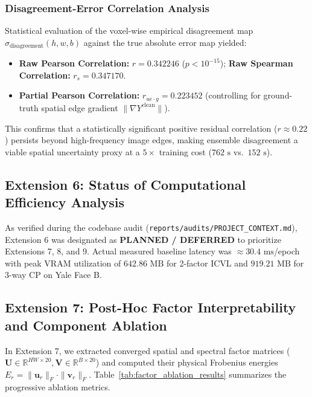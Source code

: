 \subsubsection{Disagreement-Error Correlation Analysis}
Statistical evaluation of the voxel-wise empirical disagreement map $\sigma_\text{disagreement}(h, w, b)$ against the true absolute error map yielded:
\begin{itemize}[itemsep=1pt]
    \item \textbf{Raw Pearson Correlation:} $r = 0.342246$ ($p < 10^{-15}$); \textbf{Raw Spearman Correlation:} $r_s = 0.347170$.
    \item \textbf{Partial Pearson Correlation:} $r_{ue \cdot g} = 0.223452$ (controlling for ground-truth spatial edge gradient $\|\nabla Y^\text{clean}\|$).
\end{itemize}
This confirms that a statistically significant positive residual correlation ($r \approx 0.22$) persists beyond high-frequency image edges, making ensemble disagreement a viable spatial uncertainty proxy at a $5\times$ training cost ($762\text{ s}$ vs.\ $152\text{ s}$).

\subsection{Extension 6: Status of Computational Efficiency Analysis}
\label{subsec:ext6_status}
As verified during the codebase audit (\texttt{reports/audits/PROJECT\_CONTEXT.md}), Extension 6 was designated as \textbf{PLANNED / DEFERRED} to prioritize Extensions 7, 8, and 9. Actual measured baseline latency was $\approx 30.4\text{ ms}$/epoch with peak VRAM utilization of $642.86\text{ MB}$ for 2-factor ICVL and $919.21\text{ MB}$ for 3-way CP on Yale Face B.

\subsection{Extension 7: Post-Hoc Factor Interpretability and Component Ablation}
\label{subsec:ext7_results}
In Extension 7, we extracted converged spatial and spectral factor matrices ($\mathbf{U} \in \mathbb{R}^{HW \times 20}, \mathbf{V} \in \mathbb{R}^{B \times 20}$) and computed their physical Frobenius energies $E_r = \|\mathbf{u}_r\|_F \cdot \|\mathbf{v}_r\|_F$. Table~\ref{tab:factor_ablation_results} summarizes the progressive ablation metrics.

